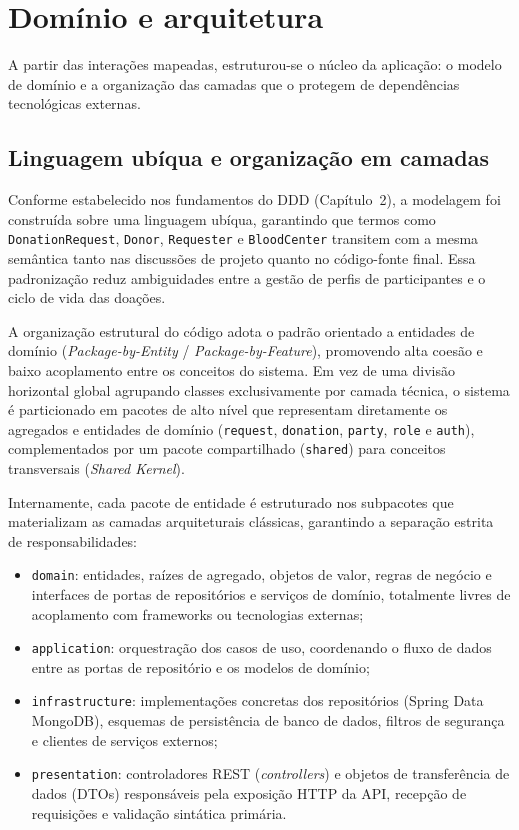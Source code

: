 \section{Domínio e arquitetura}

A partir das interações mapeadas, estruturou-se o núcleo da aplicação: o modelo de domínio e a organização das camadas que o protegem de dependências tecnológicas externas.

\subsection{Linguagem ubíqua e organização em camadas}

Conforme estabelecido nos fundamentos do DDD (Capítulo~2), a modelagem foi construída sobre uma linguagem ubíqua, garantindo que termos como \texttt{DonationRequest}, \texttt{Donor}, \texttt{Requester} e \texttt{BloodCenter} transitem com a mesma semântica tanto nas discussões de projeto quanto no código-fonte final. Essa padronização reduz ambiguidades entre a gestão de perfis de participantes e o ciclo de vida das doações. 

A organização estrutural do código adota o padrão orientado a entidades de domínio (\textit{Package-by-Entity} / \textit{Package-by-Feature}), promovendo alta coesão e baixo acoplamento entre os conceitos do sistema. Em vez de uma divisão horizontal global agrupando classes exclusivamente por camada técnica, o sistema é particionado em pacotes de alto nível que representam diretamente os agregados e entidades de domínio (\texttt{request}, \texttt{donation}, \texttt{party}, \texttt{role} e \texttt{auth}), complementados por um pacote compartilhado (\texttt{shared}) para conceitos transversais (\textit{Shared Kernel}).

Internamente, cada pacote de entidade é estruturado nos subpacotes que materializam as camadas arquiteturais clássicas, garantindo a separação estrita de responsabilidades:

\begin{itemize}[leftmargin=*]
  \item \texttt{domain}: entidades, raízes de agregado, objetos de valor, regras de negócio e interfaces de portas de repositórios e serviços de domínio, totalmente livres de acoplamento com frameworks ou tecnologias externas;
  \item \texttt{application}: orquestração dos casos de uso, coordenando o fluxo de dados entre as portas de repositório e os modelos de domínio;
  \item \texttt{infrastructure}: implementações concretas dos repositórios (Spring Data MongoDB), esquemas de persistência de banco de dados, filtros de segurança e clientes de serviços externos;
  \item \texttt{presentation}: controladores REST (\textit{controllers}) e objetos de transferência de dados (DTOs) responsáveis pela exposição HTTP da API, recepção de requisições e validação sintática primária.
\end{itemize}

